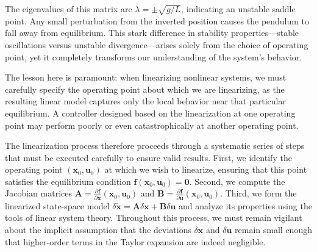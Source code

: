 \begin{example}
The eigenvalues of this matrix are $\lambda = \pm \sqrt{g/L}$, indicating an unstable saddle point. Any small perturbation from the inverted position causes the pendulum to fall away from equilibrium. This stark difference in stability properties---stable oscillations versus unstable divergence---arises solely from the choice of operating point, yet it completely transforms our understanding of the system's behavior.

The lesson here is paramount: when linearizing nonlinear systems, we must carefully specify the operating point about which we are linearizing, as the resulting linear model captures only the local behavior near that particular equilibrium. A controller designed based on the linearization at one operating point may perform poorly or even catastrophically at another operating point.
\end{example}

The linearization process therefore proceeds through a systematic series of steps that must be executed carefully to ensure valid results. First, we identify the operating point $(\mathbf{x}_0, \mathbf{u}_0)$ at which we wish to linearize, ensuring that this point satisfies the equilibrium condition $\mathbf{f}(\mathbf{x}_0, \mathbf{u}_0) = \mathbf{0}$. Second, we compute the Jacobian matrices $\mathbf{A} = \frac{\partial \mathbf{f}}{\partial \mathbf{x}}(\mathbf{x}_0, \mathbf{u}_0)$ and $\mathbf{B} = \frac{\partial \mathbf{f}}{\partial \mathbf{u}}(\mathbf{x}_0, \mathbf{u}_0)$. Third, we form the linearized state-space model $\delta\dot{\mathbf{x}} = \mathbf{A}\delta\mathbf{x} + \mathbf{B}\delta\mathbf{u}$ and analyze its properties using the tools of linear system theory. Throughout this process, we must remain vigilant about the implicit assumption that the deviations $\delta\mathbf{x}$ and $\delta\mathbf{u}$ remain small enough that higher-order terms in the Taylor expansion are indeed negligible.

